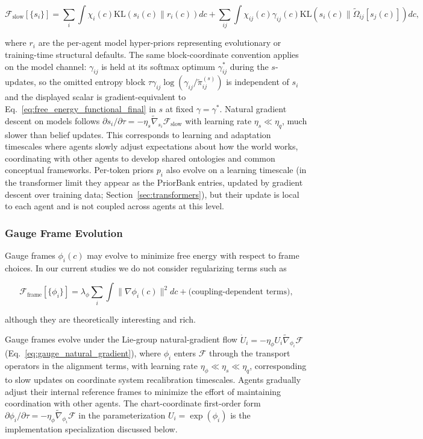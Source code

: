 \documentclass[11pt]{article}
\begin{document}
\begin{equation}
\mathcal{F}_{\text{slow}}[\{s_i\}] = \sum_i \int \chi_i(c)  \mathrm{KL}(s_i(c) \| r_i(c))  dc
+ \sum_{ij} \int \chi_{ij}(c)  \gamma_{ij}(c)  \mathrm{KL}(s_i(c) \| \tilde{\Omega}_{ij}[s_j(c)])  dc,
\end{equation}

where $r_i$ are the per-agent model hyper-priors representing evolutionary or training-time structural defaults. The same block-coordinate convention applies on the model channel: $\gamma_{ij}$ is held at its softmax optimum $\gamma^*_{ij}$ during the $s$-updates, so the omitted entropy block $\tau\gamma_{ij}\log(\gamma_{ij}/\tilde{\pi}^{(s)}_{ij})$ is independent of $s_i$ and the displayed scalar is gradient-equivalent to Eq.~\eqref{eq:free_energy_functional_final} in $s$ at fixed $\gamma = \gamma^*$. Natural gradient descent on models follows $\partial s_i/\partial \tau = -\eta_s  \tilde{\nabla}_{s_i} \mathcal{F}_{\text{slow}}$ with learning rate $\eta_s \ll \eta_q$, much slower than belief updates. This corresponds to learning and adaptation timescales where agents slowly adjust expectations about how the world works, coordinating with other agents to develop shared ontologies and common conceptual frameworks. Per-token priors $p_i$ also evolve on a learning timescale (in the transformer limit they appear as the PriorBank entries, updated by gradient descent over training data; Section~\ref{sec:transformers}), but their update is local to each agent and is not coupled across agents at this level.

\subsubsection{Gauge Frame Evolution}

Gauge frames $\phi_i(c)$ may evolve to minimize free energy with respect to frame choices.  In our current studies we do not consider regularizing terms such as

\begin{equation}
\mathcal{F}_{\text{frame}}[\{\phi_i\}] = \lambda_\phi \sum_i \int \|\nabla \phi_i(c)\|^2  dc + \text{(coupling-dependent terms)},
\end{equation}

although they are theoretically interesting and rich.

Gauge frames evolve under the Lie-group natural-gradient flow $\dot U_i = -\eta_\phi U_i \tilde{\nabla}_{\phi_i}\mathcal{F}$ (Eq.~\ref{eq:gauge_natural_gradient}), where $\phi_i$ enters $\mathcal{F}$ through the transport operators in the alignment terms, with learning rate $\eta_\phi \ll \eta_s \ll \eta_q$, corresponding to slow updates on coordinate system recalibration timescales. Agents gradually adjust their internal reference frames to minimize the effort of maintaining coordination with other agents. The chart-coordinate first-order form $\partial\phi_i/\partial\tau = -\eta_\phi \tilde{\nabla}_{\phi_i}\mathcal{F}$ in the parameterization $U_i = \exp(\phi_i)$ is the implementation specialization discussed below.
\end{document}
